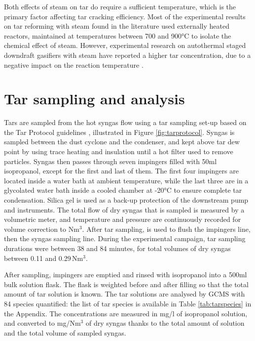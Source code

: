 Both effects of steam on tar do require a sufficient temperature, which is the primary factor affecting tar cracking efficiency. Most of the experimental results on tar reforming with steam found in the literature used externally heated reactors, maintained at temperatures between 700 and 900°C to isolate the chemical effect of steam. However, experimental research on autothermal staged downdraft gasifiers with steam have reported a higher tar concentration, due to a negative impact on the reaction temperature \cite{Jarungthammachote2012, DeSales2017}.


\section{Tar sampling and analysis}

Tars are sampled from the hot syngas flow using a tar sampling set-up based on the Tar Protocol guidelines \cite{Neeft2002}, illustrated in Figure \ref{fig:tarprotocol}. Syngas is sampled between the dust cyclone and the condenser, and kept above tar dew point by using trace heating and insulation until a hot filter used to remove particles. Syngas then passes through seven impingers filled with 50ml isopropanol, except for the first and last of them. The first four impingers are located inside a water bath at ambient temperature, while the last three are in a glycolated water bath inside a cooled chamber at -20°C to ensure complete tar condensation. Silica gel is used as a back-up protection of the downstream pump and instruments. The total flow of dry syngas that is sampled is measured by a volumetric meter, and temperature and pressure are continuously recorded for volume correction to Nm$^3$. After tar sampling,  is used to flush the impingers line, then the syngas sampling line. During the experimental campaign, tar sampling durations were between 38 and 84 minutes, for total volumes of dry syngas between 0.11 and 0.29\,Nm$^3$.

After sampling, impingers are emptied and rinsed with isopropanol into a 500ml bulk solution flask. The flask is weighted before and after filling so that the total amount of tar solution is known. The tar solutions are analysed by GCMS with 84 species quantified: the list of tar species is available in Table \ref{tab:tarspecies} in the Appendix. The concentrations are measured in mg/l of isopropanol solution, and converted to mg/Nm$^3$ of dry syngas thanks to the total amount of solution and the total volume of sampled syngas.

